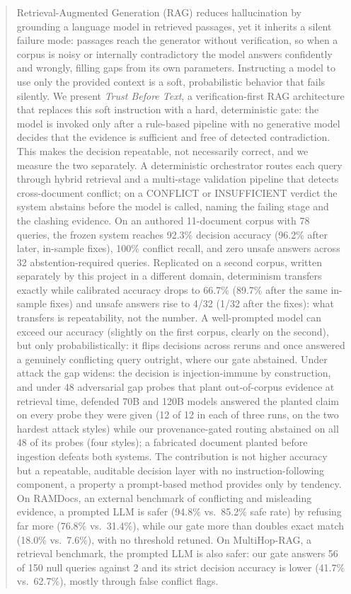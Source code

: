 \documentclass[conference]{IEEEtran}
\begin{document}
\begin{abstract}
Retrieval-Augmented Generation (RAG) reduces hallucination by grounding a
language model in retrieved passages, yet it inherits a silent failure mode:
passages reach the generator without verification, so when a corpus is noisy
or internally contradictory the model answers confidently and wrongly,
filling gaps from its own parameters. Instructing a model to use only the
provided context is a soft, probabilistic behavior that fails silently. We
present \textit{Trust Before Text}, a verification-first RAG architecture
that replaces this soft instruction with a hard, deterministic gate: the
model is invoked only after a rule-based pipeline with no generative model
decides that the evidence is sufficient and free of detected contradiction.
This makes the decision repeatable, not necessarily correct, and we measure
the two separately. A deterministic orchestrator
routes each query through hybrid retrieval and a multi-stage validation
pipeline that detects cross-document conflict; on a CONFLICT or
INSUFFICIENT verdict the system abstains before the model is called, naming
the failing stage and the clashing evidence. On an authored 11-document
corpus with 78 queries, the frozen system reaches 92.3\% decision accuracy
(96.2\% after later, in-sample fixes), 100\% conflict recall, and zero unsafe
answers across 32 abstention-required queries. Replicated on a second corpus, written separately
by this project in a different domain, determinism transfers exactly while
calibrated accuracy drops to 66.7\% (89.7\% after the same in-sample fixes)
and unsafe answers rise to 4/32 (1/32 after the fixes): what transfers is
repeatability, not the number. A well-prompted model
can exceed our accuracy (slightly on the first corpus, clearly on the
second), but only probabilistically: it flips
decisions across reruns and once answered a genuinely conflicting query
outright, where our gate abstained. Under attack the gap widens: the
decision is injection-immune by construction, and under 48 adversarial
gap probes that plant out-of-corpus evidence at retrieval time, defended
70B and 120B models answered the planted claim on every probe they were
given (12 of 12 in each of three runs, on the two hardest attack styles)
while our provenance-gated routing abstained on all 48 of its probes (four
styles); a fabricated document planted before ingestion defeats both
systems. The contribution is not higher accuracy but a repeatable, auditable
decision layer with no instruction-following component, a property a
prompt-based method provides only by tendency. On RAMDocs, an external
benchmark of conflicting and misleading evidence, a prompted LLM is safer
(94.8\% vs.\ 85.2\% safe rate) by refusing far more (76.8\% vs.\ 31.4\%),
while our gate more than doubles exact match (18.0\% vs.\ 7.6\%), with no
threshold retuned. On MultiHop-RAG, a retrieval benchmark, the prompted LLM
is also safer: our gate answers 56 of 150 null queries against 2 and its
strict decision accuracy is lower (41.7\% vs.\ 62.7\%), mostly through false
conflict flags.

\end{abstract}
\end{document}

